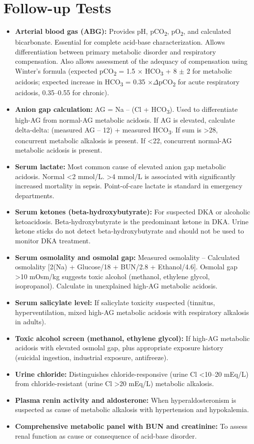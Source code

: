 \section*{Follow-up Tests}
\begin{itemize}
  \item \textbf{Arterial blood gas (ABG):} Provides pH, pCO\textsubscript{2}, pO\textsubscript{2}, and calculated bicarbonate. Essential for complete acid-base characterization. Allows differentiation between primary metabolic disorder and respiratory compensation. Also allows assessment of the adequacy of compensation using Winter's formula (expected pCO\textsubscript{2} = 1.5 $\times$ HCO\textsubscript{3} + 8 $\pm$ 2 for metabolic acidosis; expected increase in HCO\textsubscript{3} = 0.35 $\times \Delta$pCO\textsubscript{2} for acute respiratory acidosis, 0.35--0.55 for chronic).
  \item \textbf{Anion gap calculation:} AG = Na -- (Cl + HCO\textsubscript{3}). Used to differentiate high-AG from normal-AG metabolic acidosis. If AG is elevated, calculate delta-delta: (measured AG -- 12) + measured HCO\textsubscript{3}. If sum is >28, concurrent metabolic alkalosis is present. If <22, concurrent normal-AG metabolic acidosis is present.
  \item \textbf{Serum lactate:} Most common cause of elevated anion gap metabolic acidosis. Normal <2 mmol/L. >4 mmol/L is associated with significantly increased mortality in sepsis. Point-of-care lactate is standard in emergency departments.
  \item \textbf{Serum ketones (beta-hydroxybutyrate):} For suspected DKA or alcoholic ketoacidosis. Beta-hydroxybutyrate is the predominant ketone in DKA. Urine ketone sticks do not detect beta-hydroxybutyrate and should not be used to monitor DKA treatment.
  \item \textbf{Serum osmolality and osmolal gap:} Measured osmolality -- Calculated osmolality [2(Na) + Glucose/18 + BUN/2.8 + Ethanol/4.6]. Osmolal gap >10 mOsm/kg suggests toxic alcohol (methanol, ethylene glycol, isopropanol). Calculate in unexplained high-AG metabolic acidosis.
  \item \textbf{Serum salicylate level:} If salicylate toxicity suspected (tinnitus, hyperventilation, mixed high-AG metabolic acidosis with respiratory alkalosis in adults).
  \item \textbf{Toxic alcohol screen (methanol, ethylene glycol):} If high-AG metabolic acidosis with elevated osmolal gap, plus appropriate exposure history (suicidal ingestion, industrial exposure, antifreeze).
  \item \textbf{Urine chloride:} Distinguishes chloride-responsive (urine Cl <10--20 mEq/L) from chloride-resistant (urine Cl >20 mEq/L) metabolic alkalosis.
  \item \textbf{Plasma renin activity and aldosterone:} When hyperaldosteronism is suspected as cause of metabolic alkalosis with hypertension and hypokalemia.
  \item \textbf{Comprehensive metabolic panel with BUN and creatinine:} To assess renal function as cause or consequence of acid-base disorder.
\end{itemize}

